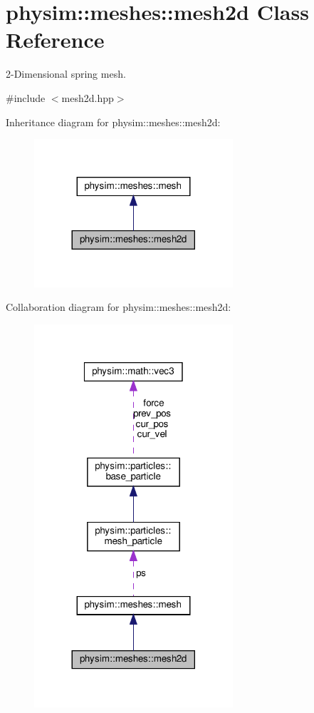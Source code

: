 \hypertarget{classphysim_1_1meshes_1_1mesh2d}{}\section{physim\+:\+:meshes\+:\+:mesh2d Class Reference}
\label{classphysim_1_1meshes_1_1mesh2d}


2-\/\+Dimensional spring mesh.  




{\ttfamily \#include $<$mesh2d.\+hpp$>$}



Inheritance diagram for physim\+:\+:meshes\+:\+:mesh2d\+:\nopagebreak
\begin{figure}[H]
\begin{center}
\leavevmode
\includegraphics[width=209pt]{classphysim_1_1meshes_1_1mesh2d__inherit__graph}
\end{center}
\end{figure}


Collaboration diagram for physim\+:\+:meshes\+:\+:mesh2d\+:\nopagebreak
\begin{figure}[H]
\begin{center}
\leavevmode
\includegraphics[width=209pt]{classphysim_1_1meshes_1_1mesh2d__coll__graph}
\end{center}
\end{figure}
